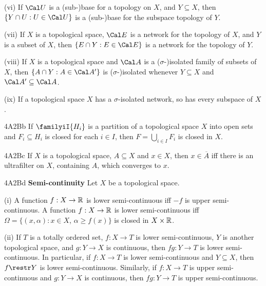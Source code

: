 
\quad (vi) If $\Cal U$ is a (sub-\nobreak)base for a topology on $X$,
and $Y\subseteq X$, then
$\{Y\cap U:U\in\Cal U\}$ is a (sub-\nobreak)base for the subspace
topology of $Y$.   

\quad (vii) If $X$ is a topological space, $\Cal E$ is a network for the
topology of $X$, and $Y$ is a subset of $X$, then
$\{E\cap Y:E\in\Cal E\}$ is a network for the topology of $Y$.

\quad (viii) If $X$ is a topological space and $\Cal A$ is a
($\sigma$-\nobreak)isolated family of subsets of $X$, then
$\{A\cap Y:A\in\Cal A'\}$ is ($\sigma$-\nobreak)isolated whenever
$Y\subseteq X$ and $\Cal A'\subseteq\Cal A$.

\quad (ix) If a topological space $X$ has a $\sigma$-isolated
network, so has every subspace of $X$.

\spheader 4A2Bb
If $\familyiI{H_i}$ is a partition of a topological space $X$ into open
sets and $F_i\subseteq H_i$ is closed for each $i\in I$, then $F=\bigcup_{i\in I}F_i$ is closed in
$X$.

\spheader 4A2Bc If $X$ is a topological space, $A\subseteq X$ and
$x\in X$,
then $x\in\overline{A}$ iff there is an ultrafilter on $X$, containing
$A$, which converges to $x$.

\spheader 4A2Bd {\bf Semi-continuity} Let $X$ be a topological space.

\quad(i) A function $f:X\to\Bbb R$ is lower semi-continuous iff $-f$ is
upper semi-continuous.
A function $f:X\to\Bbb R$ is lower semi-continuous iff
$\Omega=\{(x,\alpha):x\in X$, $\alpha\ge f(x)\}$ is closed in
$X\times\Bbb R$.
{}

\quad(ii) If $T$ is a totally ordered set, $f:X\to T$ is lower
semi-continuous, $Y$ is another topological space,
and $g:Y\to X$ is continuous, then $fg:Y\to T$ is lower
semi-continuous.
In particular, if $f:X\to T$ is lower semi-continuous and
$Y\subseteq X$, then $f\restr Y$ is lower semi-continuous.
Similarly, if $f:X\to T$ is upper semi-continuous
and $g:Y\to X$ is continuous, then $fg:Y\to T$ is upper
semi-continuous.

